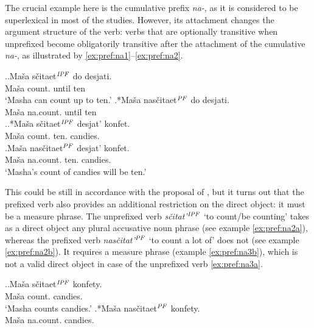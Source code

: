 The crucial example here is the cumulative prefix \textit{na-}, as it is considered to be superlexical in most of the studies. However, its attachment changes the argument structure of the verb: verbs that are optionally transitive when unprefixed become obligatorily transitive after the attachment of the cumulative \textit{na-}, as illustrated by \ref{ex:pref:na1}--\ref{ex:pref:na2}.

\ex.\label{ex:pref:na1}\ag.\label{ex:pref:na1a}Ma\v{s}a s\v{c}itaet$^{\mathit{IPF}}$ do desjati.\\
Ma\v{s}a count. until ten\\
\vspace{0.5em}
`Masha can count up to ten.'
\bg.*Ma\v{s}a nas\v{c}itaet$^{\mathit{PF}}$ do desjati.\label{ex:pref:na1b}\\
Ma\v{s}a na.count. until ten\\

\ex.\label{ex:pref:na2}\ag.*Ma\v{s}a s\v{c}itaet$^{\mathit{IPF}}$ desjat' konfet.\label{ex:pref:na2a}\\
Ma\v{s}a count. ten. candies.\\
\bg.\label{ex:pref:na2b}Ma\v{s}a nas\v{c}itaet$^{\mathit{PF}}$ desjat' konfet.\\
Ma\v{s}a na.count. ten. candies.\\
\vspace{0.5em}
`Masha's count of candies will be ten.'

This could be still in accordance with the proposal of \citet{Tatevosov:09}, but it turns out that the prefixed verb also provides an additional restriction on the direct object: it must be a measure phrase. The unprefixed verb \textit{s\v{c}itat'}$^{\mathit{IPF}}$ `to count/be counting' takes as a direct object any plural accusative noun phrase (see example \ref{ex:pref:na2a}), whereas the prefixed verb \textit{nas\v{c}itat'}$^{\mathit{PF}}$ `to count a lot of' does not (see example \ref{ex:pref:na2b}). It requires a measure phrase (example \ref{ex:pref:na3b}), which is not a valid direct object in case of the unprefixed verb \ref{ex:pref:na3a}. 

\ex.\label{ex:pref:na3}\ag.\label{ex:pref:na3a}Ma\v{s}a s\v{c}itaet$^{\mathit{IPF}}$ konfety.\\
Ma\v{s}a count. candies.\\
\vspace{0.5em}
`Masha counts candies.'
\bg.*Ma\v{s}a nas\v{c}itaet$^{\mathit{PF}}$ konfety.\label{ex:pref:na3b}\\
Ma\v{s}a na.count. candies.\\

